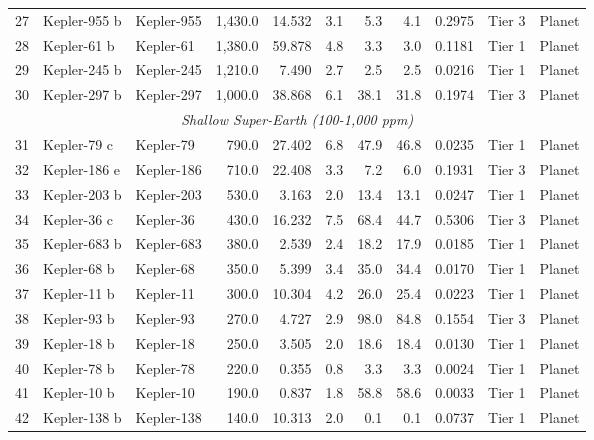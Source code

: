 \begin{longtable}{r l l r r r r r r l l}
27 & Kepler-955 b     & Kepler-955   &   1,430.0 &  14.532 &   3.1 &    5.3 &    4.1 &  0.2975 & Tier 3  & Planet \\
28 & Kepler-61 b      & Kepler-61    &   1,380.0 &  59.878 &   4.8 &    3.3 &    3.0 &  0.1181 & Tier 1  & Planet \\
29 & Kepler-245 b     & Kepler-245   &   1,210.0 &   7.490 &   2.7 &    2.5 &    2.5 &  0.0216 & Tier 1  & Planet \\
30 & Kepler-297 b     & Kepler-297   &   1,000.0 &  38.868 &   6.1 &   38.1 &   31.8 &  0.1974 & Tier 3  & Planet \\
\hline
\multicolumn{11}{c}{\textit{Shallow Super-Earth (100-1,000 ppm)}} \\
\hline
31 & Kepler-79 c      & Kepler-79    &     790.0 &  27.402 &   6.8 &   47.9 &   46.8 &  0.0235 & Tier 1  & Planet \\
32 & Kepler-186 e     & Kepler-186   &     710.0 &  22.408 &   3.3 &    7.2 &    6.0 &  0.1931 & Tier 3  & Planet \\
33 & Kepler-203 b     & Kepler-203   &     530.0 &   3.163 &   2.0 &   13.4 &   13.1 &  0.0247 & Tier 1  & Planet \\
34 & Kepler-36 c      & Kepler-36    &     430.0 &  16.232 &   7.5 &   68.4 &   44.7 &  0.5306 & Tier 3  & Planet \\
35 & Kepler-683 b     & Kepler-683   &     380.0 &   2.539 &   2.4 &   18.2 &   17.9 &  0.0185 & Tier 1  & Planet \\
36 & Kepler-68 b      & Kepler-68    &     350.0 &   5.399 &   3.4 &   35.0 &   34.4 &  0.0170 & Tier 1  & Planet \\
37 & Kepler-11 b      & Kepler-11    &     300.0 &  10.304 &   4.2 &   26.0 &   25.4 &  0.0223 & Tier 1  & Planet \\
38 & Kepler-93 b      & Kepler-93    &     270.0 &   4.727 &   2.9 &   98.0 &   84.8 &  0.1554 & Tier 3  & Planet \\
39 & Kepler-18 b      & Kepler-18    &     250.0 &   3.505 &   2.0 &   18.6 &   18.4 &  0.0130 & Tier 1  & Planet \\
40 & Kepler-78 b      & Kepler-78    &     220.0 &   0.355 &   0.8 &    3.3 &    3.3 &  0.0024 & Tier 1  & Planet \\
41 & Kepler-10 b      & Kepler-10    &     190.0 &   0.837 &   1.8 &   58.8 &   58.6 &  0.0033 & Tier 1  & Planet \\
42 & Kepler-138 b     & Kepler-138   &     140.0 &  10.313 &   2.0 &    0.1 &    0.1 &  0.0737 & Tier 1  & Planet \\

\end{longtable}
